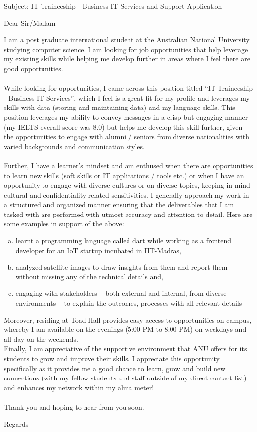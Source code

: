 \documentclass{letter}
\begin{document}
\begin{letter}{Subject: IT Traineeship - Business IT Services and Support Application }
\opening{Dear Sir/Madam}
I am a post graduate international student at the Australian National University studying computer science. I am looking for job opportunities that help leverage my existing skills while helping me develop further in areas where I feel there are good opportunities.\\ \\
 While looking for opportunities, I came across this position titled “IT Traineeship - Business IT Services”, which I feel is a great fit for my profile and leverages my skills with data (storing and maintaining data) and my language skills. This position leverages my ability to convey messages in a crisp but engaging manner (my IELTS overall score was 8.0) but helps me develop this skill further, given the opportunities to engage with alumni / seniors from diverse nationalities with varied backgrounds and communication styles. \\ \\
Further, I have a learner’s mindset and am enthused when there are opportunities to learn new skills (soft skills or IT applications / tools etc.)  or when I have an opportunity to engage with diverse cultures or on diverse topics, keeping in mind cultural and confidentiality related sensitivities. I generally approach my work in a structured and organized manner ensuring that the deliverables that I am tasked with are performed with utmost accuracy and attention to detail. Here are some examples in support of the above:
\begin{enumerate}[(a)]
	\item learnt a programming language called dart while working as a frontend developer for an IoT startup incubated in IIT-Madras, 
	\item analyzed satellite images to draw insights from them and report them without missing any of the technical details and,
	\item engaging with stakeholders – both external and internal, from diverse environments – to explain the outcomes, processes with all relevant details 
\end{enumerate}
 Moreover, residing at Toad Hall provides easy access to opportunities on campus, whereby I am available on the evenings (5:00 PM to 8:00 PM) on weekdays and all day on the weekends.
\\Finally, I am appreciative of the supportive environment that ANU offers for its students to grow and improve their skills. I appreciate this opportunity specifically as it provides me a good chance to learn, grow and build new connections (with my fellow students and staff outside of my direct contact list) and enhances my network within my alma meter! \\ \\
Thank you and hoping to hear from you soon.
\closing{Regards}
\end{letter}
\end{document}
